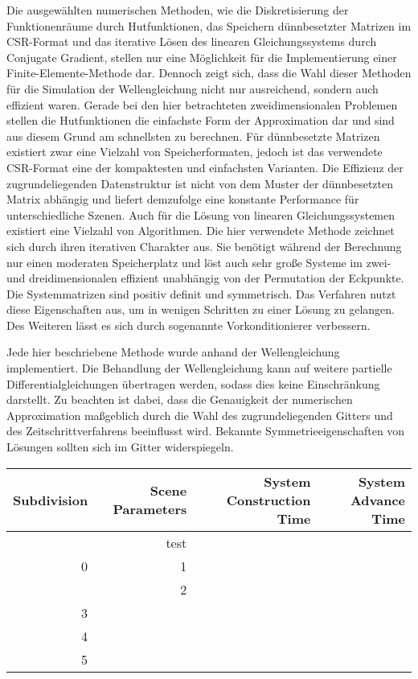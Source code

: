\documentclass{article}
\begin{document}
    Die ausgewählten numerischen Methoden, wie die Diskretisierung der Funktionenräume durch Hutfunktionen, das Speichern dünnbesetzter Matrizen im CSR-Format und das iterative Lösen des linearen Gleichungssystems durch Conjugate Gradient, stellen nur eine Möglichkeit für die Implementierung einer Finite-Elemente-Methode dar.
    Dennoch zeigt sich, dass die Wahl dieser Methoden für die Simulation der Wellengleichung nicht nur ausreichend, sondern auch effizient waren.
    Gerade bei den hier betrachteten zweidimensionalen Problemen stellen die Hutfunktionen die einfachste Form der Approximation dar und sind aus diesem Grund am schnellsten zu berechnen.
    Für dünnbesetzte Matrizen existiert zwar eine Vielzahl von Speicherformaten, jedoch ist das verwendete CSR-Format eine der kompaktesten und einfachsten Varianten.
    Die Effizienz der zugrundeliegenden Datenstruktur ist nicht von dem Muster der dünnbesetzten Matrix abhängig und liefert demzufolge eine konstante Performance für unterschiedliche Szenen.
    Auch für die Lösung von linearen Gleichungssystemen existiert eine Vielzahl von Algorithmen.
    Die hier verwendete Methode zeichnet sich durch ihren iterativen Charakter aus.
    Sie benötigt während der Berechnung nur einen moderaten Speicherplatz und löst auch sehr große Systeme im zwei- und dreidimensionalen effizient unabhängig von der Permutation der Eckpunkte.
    Die Systemmatrizen sind positiv definit und symmetrisch.
    Das Verfahren nutzt diese Eigenschaften aus, um in wenigen Schritten zu einer Lösung zu gelangen.
    Des Weiteren lässt es sich durch sogenannte Vorkonditionierer verbessern.

    Jede hier beschriebene Methode wurde anhand der Wellengleichung implementiert.
    Die Behandlung der Wellengleichung kann auf weitere partielle Differentialgleichungen übertragen werden, sodass dies keine Einschränkung darstellt.
    Zu beachten ist dabei, dass die Genauigkeit der numerischen Approximation maßgeblich durch die Wahl des zugrundeliegenden Gitters und des Zeitschrittverfahrens beeinflusst wird.
    Bekannte Symmetrieeigenschaften von Lösungen sollten sich im Gitter widerspiegeln.

    \begin{table}[h]
      \begin{tabular}{rrrr}
        \hline
        Subdivision & Scene Parameters & System Construction Time & System Advance Time \\
        \hline
        \hline
        \multirow{3}{*}{0}
          & test  \\
          & 1 & \\
          & 2 & \\
        3 \\
        4 \\
        5
      \end{tabular}
    \end{table}

\end{document}
